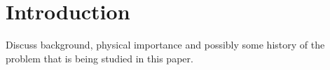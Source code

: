 \section{Introduction}
\label{sec:introduction}

Discuss background, physical importance and possibly some history of
the problem that is being studied in this paper.
